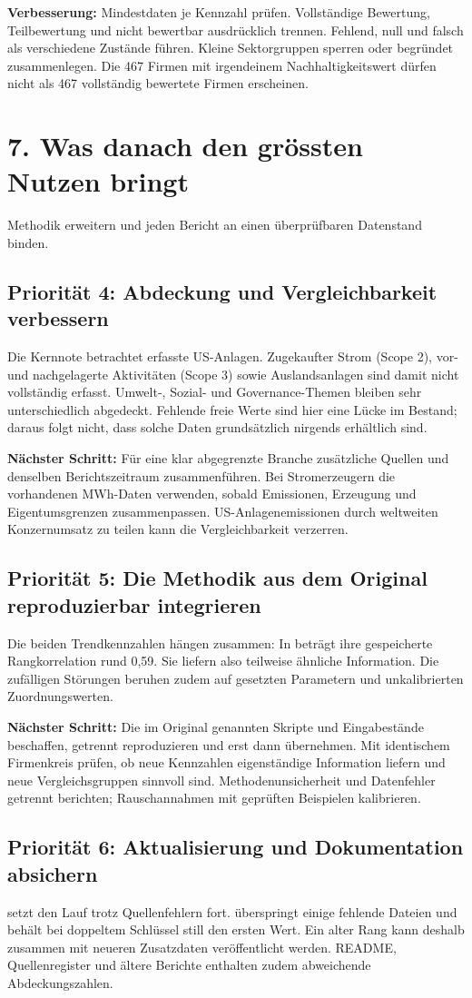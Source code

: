 \documentclass[11pt,a4paper]{article}
\newcommand{\pf}[1]{\path{#1}}
\newcommand{\lead}[1]{{\large\sffamily\color{accent}#1}\par}
\newcommand{\page}[2]{\clearpage\section*{#1}\lead{#2}}
\begin{document}
\textbf{Verbesserung:} Mindestdaten je Kennzahl prüfen. Vollständige Bewertung, Teilbewertung und nicht bewertbar ausdrücklich trennen. Fehlend, null und falsch als verschiedene Zustände führen. Kleine Sektorgruppen sperren oder begründet zusammenlegen. Die 467 Firmen mit irgendeinem Nachhaltigkeitswert dürfen nicht als 467 vollständig bewertete Firmen erscheinen.

\page{7. Was danach den grössten Nutzen bringt}{Methodik erweitern und jeden Bericht an einen überprüfbaren Datenstand binden.}
\subsection*{Priorität 4: Abdeckung und Vergleichbarkeit verbessern}
Die Kernnote betrachtet erfasste US-Anlagen. Zugekaufter Strom (Scope 2), vor- und nachgelagerte Aktivitäten (Scope 3) sowie Auslandsanlagen sind damit nicht vollständig erfasst. Umwelt-, Sozial- und Governance-Themen bleiben sehr unterschiedlich abgedeckt. Fehlende freie Werte sind hier eine Lücke im Bestand; daraus folgt nicht, dass solche Daten grundsätzlich nirgends erhältlich sind.

\textbf{Nächster Schritt:} Für eine klar abgegrenzte Branche zusätzliche Quellen und denselben Berichtszeitraum zusammenführen. Bei Stromerzeugern die vorhandenen MWh-Daten verwenden, sobald Emissionen, Erzeugung und Eigentumsgrenzen zusammenpassen. US-Anlagenemissionen durch weltweiten Konzernumsatz zu teilen kann die Vergleichbarkeit verzerren.

\subsection*{Priorität 5: Die Methodik aus dem Original reproduzierbar integrieren}
Die beiden Trendkennzahlen hängen zusammen: In \pf{data/out/kennzahlen.json} beträgt ihre gespeicherte Rangkorrelation rund 0,59. Sie liefern also teilweise ähnliche Information. Die zufälligen Störungen beruhen zudem auf gesetzten Parametern und unkalibrierten Zuordnungswerten.

\textbf{Nächster Schritt:} Die im Original genannten Skripte und Eingabestände beschaffen, getrennt reproduzieren und erst dann übernehmen. Mit identischem Firmenkreis prüfen, ob neue Kennzahlen eigenständige Information liefern und neue Vergleichsgruppen sinnvoll sind. Methodenunsicherheit und Datenfehler getrennt berichten; Rauschannahmen mit geprüften Beispielen kalibrieren.

\subsection*{Priorität 6: Aktualisierung und Dokumentation absichern}
\pf{01_fetch.py} setzt den Lauf trotz Quellenfehlern fort. \pf{consolidate.py} überspringt einige fehlende Dateien und behält bei doppeltem Schlüssel still den ersten Wert. Ein alter Rang kann deshalb zusammen mit neueren Zusatzdaten veröffentlicht werden. README, Quellenregister und ältere Berichte enthalten zudem abweichende Abdeckungszahlen.
\end{document}
